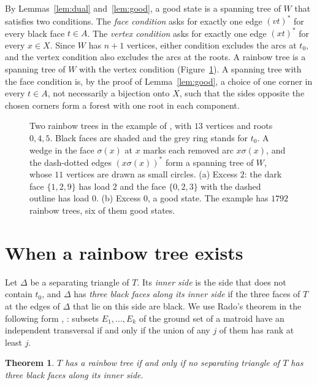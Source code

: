 \documentclass[10pt]{amsart}
\numberwithin{equation}{section}
\newtheorem{theorem}[equation]{Theorem}
\theoremstyle{definition}
\theoremstyle{remark}
\begin{document}
By Lemmas~\ref{lem:dual} and~\ref{lem:good}, a good state is a spanning tree of $W$ that satisfies two conditions.
The \emph{face condition} asks for exactly one edge $(vt)^*$ for every black face $t\in A$.
The \emph{vertex condition} asks for exactly one edge $(xt)^*$ for every $x\in X$.
Since $W$ has $n+1$ vertices, either condition excludes the arcs at $t_0$, and the vertex condition also excludes the arcs at the roots.
A rainbow tree is a spanning tree of $W$ with the vertex condition (Figure~\ref{fig:rainbow}).
A spanning tree with the face condition is, by the proof of Lemma~\ref{lem:good}, a choice of one corner in every $t\in A$, not necessarily a bijection onto $X$, such that the sides opposite the chosen corners form a forest with one root in each component.

\begin{figure}[H]
\centering
\scalebox{.9}{\begin{minipage}{\textwidth}\centering\end{minipage}}
\caption{Two rainbow trees in the example of \cite[Figure~2]{Paper}, with $13$ vertices and roots $0,4,5$. Black faces are shaded and the grey ring stands for $t_0$. A wedge in the face $\sigma(x)$ at $x$ marks each removed arc $x\sigma(x)$, and the dash-dotted edges $(x\sigma(x))^*$ form a spanning tree of $W$, whose $11$ vertices are drawn as small circles. (a) Excess $2$: the dark face $\{1,2,9\}$ has load $2$ and the face $\{0,2,3\}$ with the dashed outline has load $0$. (b) Excess $0$, a good state. The example has $1792$ rainbow trees, six of them good states.}
\label{fig:rainbow}
\end{figure}

\section{When a rainbow tree exists}\label{sec:R}

Let $\Delta$ be a separating triangle of $T$.
Its \emph{inner side} is the side that does not contain $t_0$, and $\Delta$ has \emph{three black faces along its inner side} if the three faces of $T$ at the edges of $\Delta$ that lie on this side are black.
We use Rado's theorem in the following form \cite{Rado}, \cite[Exercise~10.26]{SchrijverCourse}: subsets $E_1,\dots,E_k$ of the ground set of a matroid have an independent transversal if and only if the union of any $j$ of them has rank at least $j$.

\begin{theorem}\label{thm:R}
$T$ has a rainbow tree if and only if no separating triangle of $T$ has three black faces along its inner side.
\end{theorem}
\end{document}
